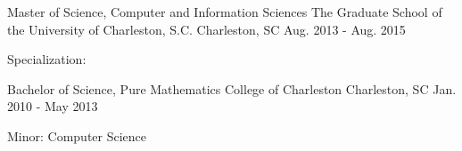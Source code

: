 

\begin{cveducations}

  \cveducation
    {Master of Science, Computer and Information Sciences} %
    {The Graduate School of the University of Charleston, S.C.} %
    {Charleston, SC} %
    {Aug. 2013 - Aug. 2015} %
    {
      \begin{cvitems} %
        \item {Specialization: }
      \end{cvitems}
    }

  \cveducation
    {Bachelor of Science, Pure Mathematics} %
    {College of Charleston} %
    {Charleston, SC} %
    {Jan. 2010 - May 2013} %
    {
      \begin{cvitems} %
        \item {Minor: Computer Science}
      \end{cvitems}
    }

\end{cveducations}
